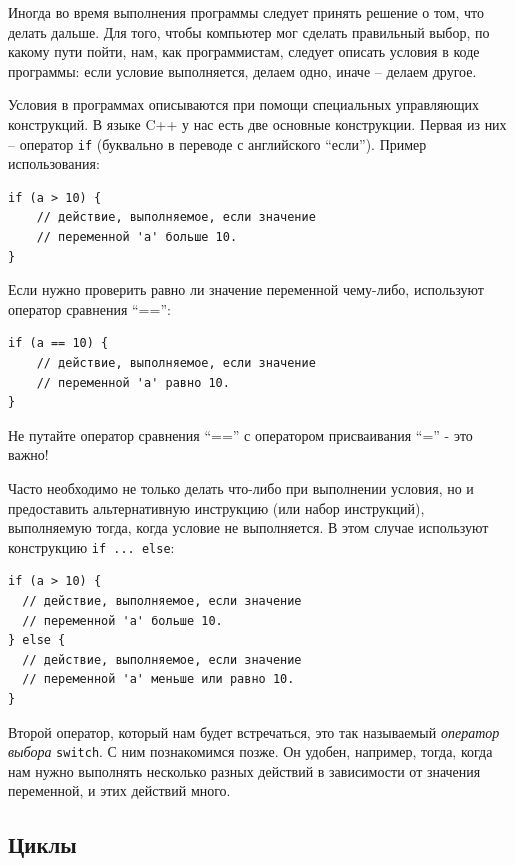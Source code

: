 \documentclass[a4paper,twoside]{book}
\begin{document}
Иногда во время выполнения программы следует принять решение о том, что делать
дальше. Для того, чтобы компьютер мог сделать правильный выбор, по какому пути
пойти, нам, как программистам, следует описать условия в коде программы: если
условие выполняется, делаем одно, иначе -- делаем другое.

Условия в программах описываются при помощи специальных управляющих конструкций.
В языке C++ у нас есть две основные конструкции. Первая из них -- оператор
\texttt{if} (буквально в переводе с английского ``если''). Пример использования:

\begin{verbatim}
if (a > 10) {
    // действие, выполняемое, если значение
    // переменной 'a' больше 10.
}
\end{verbatim}

Если нужно проверить равно ли значение переменной чему-либо, используют оператор
сравнения ``=='':

\begin{verbatim}
if (a == 10) {
    // действие, выполняемое, если значение
    // переменной 'a' равно 10.
}
\end{verbatim}

Не путайте оператор сравнения ``=='' с оператором присваивания ``='' - это важно!

Часто необходимо не только делать что-либо при выполнении условия, но и
предоставить альтернативную инструкцию (или набор инструкций), выполняемую
тогда, когда условие не выполняется. В этом случае используют конструкцию
\texttt{if ... else}:

\begin{verbatim}
if (a > 10) {
  // действие, выполняемое, если значение
  // переменной 'a' больше 10.
} else {
  // действие, выполняемое, если значение
  // переменной 'a' меньше или равно 10.
}
\end{verbatim}

Второй оператор, который нам будет встречаться, это так называемый
\emph{оператор выбора} \texttt{switch}. С ним познакомимся позже. Он удобен,
например, тогда, когда нам нужно выполнять несколько разных действий в
зависимости от значения переменной, и этих действий много.

\subsection{Циклы}
\end{document}
